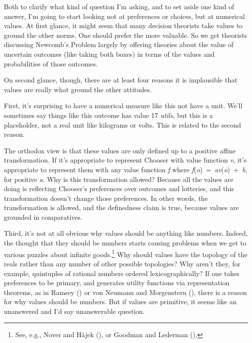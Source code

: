 \documentclass[
  11pt,
  letterpaper,
  DIV=11,
  numbers=noendperiod,
  twoside]{scrartcl}
\begin{document}
Both to clarify what kind of question I'm asking, and to set aside one
kind of answer, I'm going to start looking not at preferences or
choices, but at numerical values. At first glance, it might seem that
many decision theorists take values to ground the other norms. One
should prefer the more valuable. So we get theorists discussing
Newcomb's Problem largely by offering theories about the value of
uncertain outcomes (like taking both boxes) in terms of the values and
probabilities of those outcomes.

On second glance, though, there are at least four reasons it is
implausible that values are really what ground the other attitudes.

First, it's surprising to have a numerical measure like this not have a
unit. We'll sometimes say things like this outcome has value 17
\emph{utils}, but this is a placeholder, not a real unit like kilograms
or volts. This is related to the second reason.

The orthodox view is that these values are only defined up to a positive
affine transformation. If it's appropriate to represent Chooser with
value function \emph{v}, it's appropriate to represent them with any
value function \emph{f} where
\emph{f}(\emph{o})~=~\emph{av}(\emph{o})~+~\emph{b}, for positive
\emph{a}. Why is this transformation allowed? Because all the values are
doing is reflecting Chooser's preferences over outcomes and lotteries,
and this transformation doesn't change those preferences. In other
words, the transformation is allowed, and the definedness claim is true,
because values are grounded in comparatives.

Third, it's not at all obvious why values should be anything like
numbers. Indeed, the thought that they should be numbers starts causing
problems when we get to various puzzles about infinite goods.\footnote{See,
  e.g., Nover and Hàjek (), or Goodman and
  Lederman ().} Why should
values have the topology of the reals rather than any number of other
possible topologies? Why aren't they, for example, quintuples of
rational numbers ordered lexicographically? If one takes preferences to
be primary, and generates utility functions via representation theorems,
as in Ramsey () or von Neumann and
Morgenstern (), there is a reason for
why values should be numbers. But if values are primitive, it seems like
an unanswered and I'd say unanswerable question.
\end{document}
